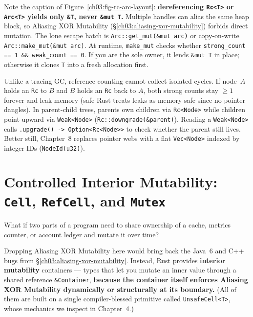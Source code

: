 Note the caption of Figure~\ref{ch03:fig-rc-arc-layout}: \textbf{dereferencing \texttt{Rc<T>} or \texttt{Arc<T>} yields only \texttt{\&T}, never \texttt{\&mut T}.} Multiple handles can alias the same heap block, so Aliasing XOR Mutability (\S\ref{ch03:aliasing-xor-mutability}) forbids direct mutation. The lone escape hatch is \texttt{Arc::get\_mut(\&mut arc)} or copy-on-write \texttt{Arc::make\_mut(\&mut arc)}. At runtime, \texttt{make\_mut} checks whether \texttt{strong\_count == 1 \&\& weak\_count == 0}. If you are the sole owner, it lends \texttt{\&mut T} in place; otherwise it clones \texttt{T} into a fresh allocation first.

\begin{remark}
Unlike a tracing GC, reference counting cannot collect isolated cycles. If node~$A$ holds an \texttt{Rc} to $B$ and $B$ holds an \texttt{Rc} back to $A$, both strong counts stay $\ge 1$ forever and leak memory (safe Rust treats leaks as memory-safe since no pointer dangles). In parent-child trees, parents own children via \texttt{Rc<Node>} while children point upward via \texttt{Weak<Node>} (\texttt{Rc::downgrade(\&parent)}). Reading a \texttt{Weak<Node>} calls \texttt{.upgrade() -> Option<Rc<Node>>} to check whether the parent still lives. Better still, Chapter~8 replaces pointer webs with a flat \texttt{Vec<Node>} indexed by integer IDs (\texttt{NodeId(u32)}).
\end{remark}

\section{Controlled Interior Mutability: \texttt{Cell}, \texttt{RefCell}, and \texttt{Mutex}}
\label{ch03:interior-mutability}

What if two parts of a program need to share ownership of a cache, metrics counter, or account ledger and mutate it over time?

Dropping Aliasing XOR Mutability here would bring back the Java~6 and C++ bugs from \S\ref{ch03:aliasing-xor-mutability}. Instead, Rust provides \textbf{interior mutability} containers --- types that let you mutate an inner value through a shared reference \texttt{\&Container}, \textbf{because the container itself enforces Aliasing XOR Mutability dynamically or structurally at its boundary.} (All of them are built on a single compiler-blessed primitive called \texttt{UnsafeCell<T>}, whose mechanics we inspect in Chapter~4.)

